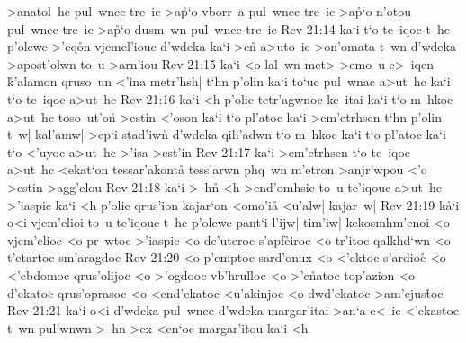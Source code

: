 >anatol~hc
pul~wnec
tre~ic
>a\r{p}`o
vborr~a
pul~wnec
tre~ic
>a\r{p}`o
n'otou
pul~wnec
tre~ic
>a\r{p}`o
dusm~wn
pul~wnec
tre~ic\bibvsend
\vs Rev 21:14
ka`i
t`o
te~iqoc
t~hc
p'olewc
>'eq\r{o}n
vjemel'iouc
d'wdeka
ka`i
>en\r{}
a>uto~ic
>on'omata
t~wn
d'wdeka
>apost'olwn
to~u
>arn'iou\bibvsend
\vs Rev 21:15
ka`i
<o
lal~wn
met>
>emo~u
e>~iqen
\r{k}'alamon
qruso~un
<'ina
metr'hsh|
t`hn
p'olin
ka`i
to`uc
pul~wnac
a>ut~hc
ka`i
t`o
te~iqoc
a>ut~hc\bibvsend
\vs Rev 21:16
ka`i
<h
p'olic
tetr'agwnoc
ke~itai
ka`i
t`o
m~hkoc
a>ut~hc
toso~ut'on\r{}
>estin
<'oson
ka`i
t`o
pl'atoc
ka`i
>em'etrhsen
t`hn
p'olin
t~w|
kal'amw|
>ep`i
stad'iwn\r{}
d'wdeka
qili'adwn
t`o
m~hkoc
ka`i
t`o
pl'atoc
ka`i
t`o
<'uyoc
a>ut~hc
>'isa
>est'in\bibvsend
\vs Rev 21:17
ka`i
>em'e\r{t}rhsen
t`o
te~iqoc
a>ut~hc
<ekat`on
tessar'akonta\r{}
tess'arwn
phq~wn
m'etron
>anjr'wpou
<'o
>estin
>agg'elou\bibvsend
\vs Rev 21:18
ka`i
>~hn\r{}
<h
>end'omhsic
to~u
te'iqouc
a>ut~hc
>'iaspic
ka`i
<h
p'olic
qrus'ion
kajar`on
<omo'ia\r{}
<u'alw|
kajar~w|\bibvsend
\vs Rev 21:19
k\r{a}`i
o<i
vjem'elioi
to~u
te'iqouc
t~hc
p'olewc
pant`i
l'ijw|
tim'iw|
kekosmhm'enoi
<o
vjem'elioc
<o
pr~wtoc
>'iaspic
<o
de'uteroc
s'apf\r{e}iroc
<o
tr'itoc
qalkhd`wn
<o
t'etartoc
sm'aragdoc\bibvsend
\vs Rev 21:20
<o
p'emptoc
sard'onux
<o
<'ektoc
s'ardio\r{c}
<o
<'ebdomoc
qrus'olijoc
<o
>'ogdooc
vb'hrulloc
<o
>'e\r{n}atoc
top'azion
<o
d'ekatoc
qrus'oprasoc
<o
<end'ekatoc
<u'akinjoc
<o
dwd'ekatoc
>am'ejus\r{t}oc\bibvsend
{}
\vs Rev 21:21
ka`i
o<i
d'wdeka
pul~wnec
d'wdeka
margar'itai
>an`a
e<~ic
<'ekastoc
t~wn
pul'wnwn
>~hn
>ex
<en`oc
margar'itou
ka`i
<h
